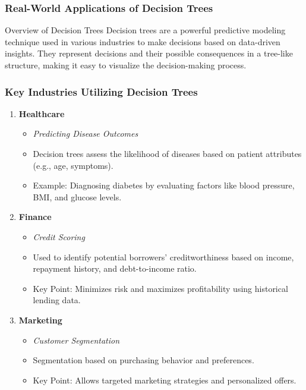 \documentclass[aspectratio=169]{beamer}
\begin{document}
\begin{frame}[fragile]
    \frametitle{Real-World Applications of Decision Trees}
    \begin{block}{Overview of Decision Trees}
        Decision trees are a powerful predictive modeling technique used in various industries to make decisions based on data-driven insights. They represent decisions and their possible consequences in a tree-like structure, making it easy to visualize the decision-making process.
    \end{block}
\end{frame}

\begin{frame}[fragile]
    \frametitle{Key Industries Utilizing Decision Trees}
    \begin{enumerate}
        \item \textbf{Healthcare}
            \begin{itemize}
                \item \textit{Predicting Disease Outcomes}
                \item Decision trees assess the likelihood of diseases based on patient attributes (e.g., age, symptoms).
                \item Example: Diagnosing diabetes by evaluating factors like blood pressure, BMI, and glucose levels.
            \end{itemize}

        \item \textbf{Finance}
            \begin{itemize}
                \item \textit{Credit Scoring}
                \item Used to identify potential borrowers' creditworthiness based on income, repayment history, and debt-to-income ratio.
                \item Key Point: Minimizes risk and maximizes profitability using historical lending data.
            \end{itemize}

        \item \textbf{Marketing}
            \begin{itemize}
                \item \textit{Customer Segmentation}
                \item Segmentation based on purchasing behavior and preferences.
                \item Key Point: Allows targeted marketing strategies and personalized offers.
            \end{itemize}
    \end{enumerate}
\end{frame}
\end{document}

